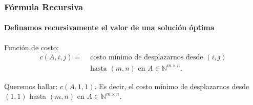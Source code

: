 \documentclass[spanish]{beamer}
\newcommand{\matA}{A \in \mathbb{N}^{m \times n}}
\begin{document}
    \begin{frame}
        \frametitle{Fórmula Recursiva}
        \framesubtitle{Definamos recursivamente el valor de una solución óptima}

        \pause

        \begin{block}{Función de costo:}
            \begin{align*}
                c(A, i, j) = & \text{ costo mínimo de desplazarnos desde } (i, j) \\
                             & \text{ hasta } (m, n) \text{ en } \matA.
            \end{align*}
        \end{block}

        \pause

        \begin{block}{Queremos hallar:}
            $c(A, 1, 1)$. \pause Es decir, el costo mínimo de desplazarnos desde $(1, 1)$ hasta $(m, n)$ en $\matA$.
        \end{block}

    \end{frame}
\end{document}
